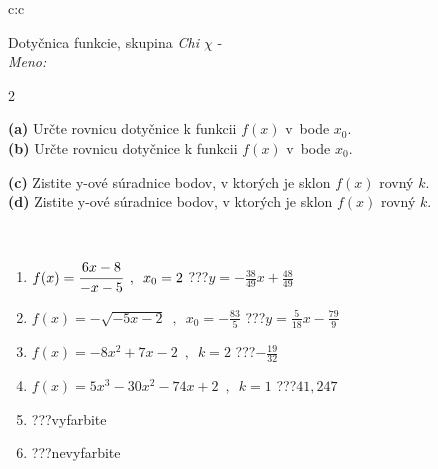 \documentclass[10pt]{report}
\begin{document}
\begin{tabular}{c:c}
\begin{minipage}[c][104.5mm][t]{0.5\linewidth}
\begin{center}
\vspace{7mm}
{\huge Dotyčnica funkcie, skupina \textit{Chi $\chi$} -}\\[5mm]
\textit{Meno:}\phantom{xxxxxxxxxxxxxxxxxxxxxxxxxxxxxxxxxxxxxxxxxxxxxxxxxxxxxxxxxxxxxxxxx}\\[5mm]
\begin{minipage}{0.95\linewidth}
\begin{center}
{\small \begin{multicols}{2} \raggedright
\textbf{(a)} Určte rovnicu dotyčnice k funkcii \(f(x)\) v~bode \(x_0\). \\[1mm]
\textbf{(b)} Určte rovnicu dotyčnice k funkcii \(f(x)\) v~bode \(x_0\). \par \columnbreak
\textbf{(c)} Zistite y-ové súradnice bodov, v ktorých je sklon \(f(x)\) rovný \(k\). \\[1mm]
\textbf{(d)} Zistite y-ové súradnice bodov, v ktorých je sklon \(f(x)\) rovný \(k\). \\[1mm]
\end{multicols}
}
\end{center}
\end{minipage}
\\[4mm]
\begin{minipage}{0.79\linewidth}
\begin{center}
\begin{varwidth}{\linewidth}
\begin{enumerate}
\normalsizerr
\item $f(x)=\cfrac{6x-8}{-x-5}\enspace , \enspace x_0=2$\quad \dotfill\; ???\;\dotfill \quad $y = -\frac{38}{49}x+\frac{48}{49}$
\item $f(x)=-\sqrt{-5x-2}\enspace , \enspace x_0=-\frac{83}{5}$\quad \dotfill\; ???\;\dotfill \quad $y = \frac{5}{18}x-\frac{79}{9}$
\item $f(x)=-8x^2+7x-2\enspace , \enspace k=2$\quad \dotfill\; ???\;\dotfill \quad $-\frac{19}{32}$
\item $f(x)=5x^3-30x^2-74x+2\enspace , \enspace k=1$\quad \dotfill\; ???\;\dotfill \quad $41 , 247$
\item \quad \dotfill\; ???\;\dotfill \quad vyfarbite
\item \quad \dotfill\; ???\;\dotfill \quad nevyfarbite
\end{enumerate}
\end{varwidth}

\end{center}
\end{minipage}
\end{center}
\end{minipage}
\end{tabular}
\end{document}
